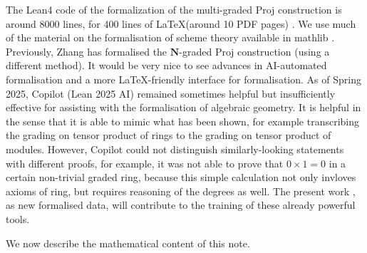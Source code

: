 \documentclass[graybox]{svmult}
\begin{document}
The Lean4 code of the formalization of the multi-graded Proj construction is around 8000 lines, for 400 lines of \LaTeX  (around 10 PDF pages) \cite{MZ25}.
We use much of the material on the formalisation of scheme theory available in mathlib \cite{Bual22, WZ22}.
Previously, Zhang has formalised the $\mathbf{N}$-graded $\mathrm{Proj}$ construction \cite{Z23} (using a different method).
It would be very nice to see advances in AI-automated formalisation and a more \LaTeX-friendly interface for formalisation.
As of Spring 2025, Copilot (Lean 2025 AI) remained sometimes helpful but insufficiently effective for assisting with the formalisation of algebraic geometry. 
It is helpful in the sense that it is able to mimic what has been shown, for example transcribing the grading on tensor product of rings to the grading on tensor product of modules.
However, Copilot could not distinguish similarly-looking statements with different proofs, 
for example, it was not able to prove that $0 \times 1 = 0$ in a certain non-trivial graded ring, because this simple calculation not only invloves axioms of ring, but requires reasoning of the degrees as well. 
The present work \cite{MZ25}, as new formalised data, will contribute to the training of these already powerful tools.

We now describe the mathematical content of this note. 
\end{document}
